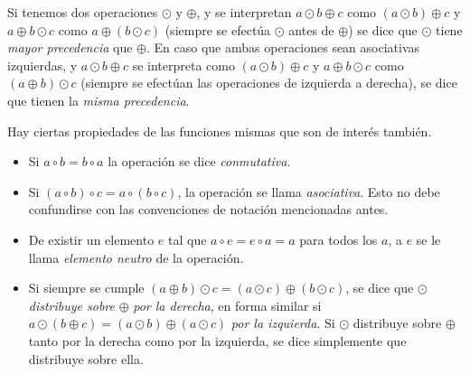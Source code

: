   Si tenemos dos operaciones \(\odot\) y \(\oplus\),
  y se interpretan
  \(a \odot b \oplus c\) como \((a \odot b) \oplus c\)
  y \(a \oplus b \odot c\) como \(a \oplus (b \odot c)\)
  (siempre se efectúa \(\odot\) antes de \(\oplus\))
  se dice que \(\odot\) tiene \emph{mayor precedencia} que \(\oplus\).
  En caso que ambas operaciones sean asociativas izquierdas,
  y \(a \odot b \oplus c\) se interpreta como \((a \odot b) \oplus c\)
  y \(a \oplus b \odot c\) como \((a \oplus b) \odot c\)
  (siempre se efectúan las operaciones de izquierda a derecha),
  se dice que tienen la \emph{misma precedencia}.

  Hay ciertas propiedades de las funciones mismas que son de interés también.
  \begin{itemize}
  \item
    Si \(a \circ b = b \circ a\) la operación se dice \emph{conmutativa}.
  \item
    Si \((a \circ b) \circ c = a \circ (b \circ c)\),
    la operación se llama \emph{asociativa}.
    Esto no debe confundirse
    con las convenciones de notación mencionadas antes.
  \item
    De existir un elemento \(e\) tal que
    \(a \circ e = e \circ a = a\) para todos los \(a\),
    a \(e\) se le llama \emph{elemento neutro} de la operación.
  \item
    Si siempre se cumple
    \((a \oplus b) \odot c = (a \odot c) \oplus (b \odot c)\),
    se dice que \(\odot\) \emph{distribuye sobre} \(\oplus\)
    \emph{por la derecha},
    en forma similar
    si \(a \odot (b \oplus c) = (a \odot b) \oplus (a \odot c)\)
    \emph{por la izquierda}.
    Si \(\odot\) distribuye sobre \(\oplus\) tanto por la derecha
    como por la izquierda,
    se dice simplemente que distribuye sobre ella.
  \end{itemize}

